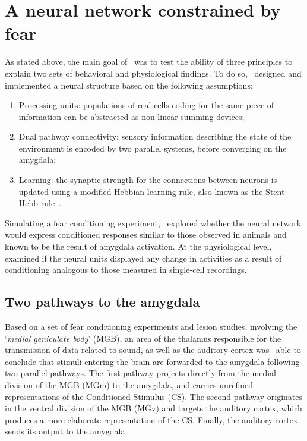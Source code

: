 \section{A neural network constrained by fear}\label{sec:armonyModel}
As stated above, the main goal of~\citet{Armony1995} was to test the ability of three principles to explain two sets of behavioral and physiological findings. To do so,~\citet{Armony1995} designed and implemented a neural structure based on the following assumptions:
\begin{enumerate}
   \item Processing units: populations of real cells coding for the same piece of information can be abstracted as non-linear summing devices;
   \item Dual pathway connectivity: sensory information describing the state of the environment is encoded by two parallel systems, before converging on the amygdala;
   \item Learning: the synaptic strength for the connections between neurons is updated using a modified Hebbian learning rule, also known as the Stent-Hebb rule~\supercite{stent_physiological_1973}.
\end{enumerate}
Simulating a fear conditioning experiment,~\citet{Armony1995} explored whether the neural network would express conditioned responses similar to those observed in animals and known to be the result of amygdala activation. At the physiological level,~\citet{Armony1995} examined if the neural units displayed any change in activities as a result of conditioning analogous to those measured in single-cell recordings.

\subsection{Two pathways to the amygdala}
Based on a set of fear conditioning experiments and lesion studies, involving the `\emph{medial geniculate body}' (MGB), an area of the thalamus responsible for the transmission of data related to sound, as well as the auditory cortex was~\citet{Ledoux1992} able to conclude that stimuli entering the brain are forwarded to the amygdala following two parallel pathways. The first pathway projects directly from the medial division of the MGB (MGm) to the amygdala, and carries unrefined representations of the Conditioned Stimulus (CS). The second pathway originates in the ventral division of the MGB (MGv) and targets the auditory cortex, which produces a more elaborate representation of the CS\@. Finally, the auditory cortex sends its output to the amygdala.\\

